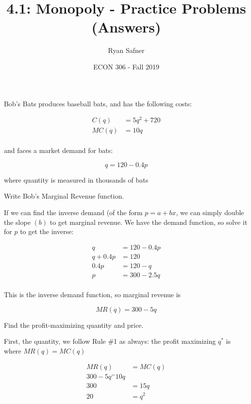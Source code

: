 \documentclass[12 pt]{exam}
\title{4.1: Monopoly - Practice Problems (Answers)}
\author{Ryan Safner}
\date{ECON 306 - Fall 2019}
\begin{document}
\maketitle

Bob's Bats produces baseball bats, and has the following costs:

\begin{align*}
C(q)&=5q^2+720\\
MC(q)&=10q\\	
\end{align*}

and faces a market demand for bats:

$$q = 120-0.4p$$

where quantity is measured in thousands of bats

\begin{questions}

\question Write Bob's Marginal Revenue function.

\begin{solution}

If we can find the inverse demand (of the form $p=a+bx$, we can simply double the slope $(b)$ to get marginal revenue. We have the demand function, so solve it for $p$ to get the inverse:

\begin{align*}
q &= 120-0.4p\\
q+0.4p&=120\\
0.4p&=120-q\\
p&=300-2.5q\\
\end{align*}

This is the inverse demand function, so marginal revenue is 

$$MR(q)=300-5q$$

\end{solution}

\question Find the profit-maximizing quantity and price.

\begin{solution}

First, the quantity, we follow Rule \#1 as always: the profit maximizing $q^*$ is where $MR(q)=MC(q)$

\begin{align*}
	MR(q)&= MC(q)\\
	300-5q^=10q\\
	300&=15q\\
	20&=q^2\\
\end{align*}


\end{solution}
\end{questions}
\end{document}
